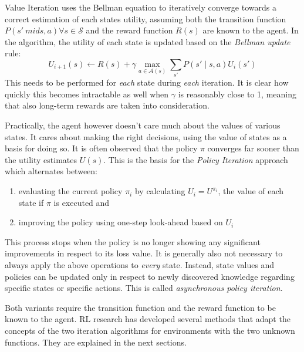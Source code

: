 Value Iteration uses the Bellman equation to iteratively converge towards a correct estimation of each states utility,
assuming both the transition function $P(s' \ mid s,a) \forall s \in \mathcal{S}$ and the reward function $R(s)$ are
known to the agent.  
In the algorithm, the utility of each state is updated based on the \emph{Bellman update} rule:
\begin{equation}
U_{i+1}(s) \gets R(s) + \gamma \max_{a \in \mathcal{A}(s)} \sum_{s'}{P(s' \mid s,a) U_i(s')}
\end{equation}
This needs to be performed for \emph{each} state during \emph{each} iteration. It is clear how quickly this becomes
intractable as well when $\gamma$ is reasonably close to 1, meaning that also long-term rewards are taken into
consideration. 

Practically, the agent however doesn't care much about the values of various states. It cares about making the right
decisions, using the value of states as a basis for doing so. It is often observed that the policy $\pi$ converges far
sooner than the utility estimates $U(s)$. This is the basis for the \emph{Policy Iteration} approach which alternates
between: 
\begin{enumerate}
	\item evaluating the current policy $\pi_i$ by calculating $U_i=U^{\pi_i}$, the value of each state if $\pi$ is
	executed and 
	\item improving the policy using one-step look-ahead based on $U_i$
\end{enumerate}

This process stops when the policy is no longer showing any significant improvements in respect to its loss value. It is
generally also not necessary to always apply the above operations to \emph{every} state. Instead, state values and
policies can be updated only in respect to newly discovered knowledge regarding specific states or specific actions.
This is called \emph{asynchronous policy iteration}. 

Both variants require the transition function and the reward function to be known to the agent. \ac {RL} research has
developed several methods that adapt the concepts of the two iteration algorithms for environments with the two unknown
functions. They are explained in the next sections. 

